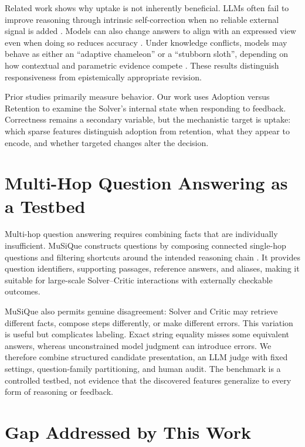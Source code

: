 Related work shows why uptake is not inherently beneficial. LLMs often fail to improve reasoning through intrinsic self-correction when no reliable external signal is added \cite{huang2024selfcorrect,kamoi2024selfcorrection}. Models can also change answers to align with an expressed view even when doing so reduces accuracy \cite{sharma2024sycophancy}. Under knowledge conflicts, models may behave as either an ``adaptive chameleon'' or a ``stubborn sloth'', depending on how contextual and parametric evidence compete \cite{xie2024chameleon}. These results distinguish responsiveness from epistemically appropriate revision.

Prior studies primarily measure behavior. Our work uses Adoption versus Retention to examine the Solver's internal state when responding to feedback. Correctness remains a secondary variable, but the mechanistic target is uptake: which sparse features distinguish adoption from retention, what they appear to encode, and whether targeted changes alter the decision.

\section{Multi-Hop Question Answering as a Testbed}

Multi-hop question answering requires combining facts that are individually insufficient. MuSiQue constructs questions by composing connected single-hop questions and filtering shortcuts around the intended reasoning chain \cite{trivedi2022musique}. It provides question identifiers, supporting passages, reference answers, and aliases, making it suitable for large-scale Solver--Critic interactions with externally checkable outcomes.

MuSiQue also permits genuine disagreement: Solver and Critic may retrieve different facts, compose steps differently, or make different errors. This variation is useful but complicates labeling. Exact string equality misses some equivalent answers, whereas unconstrained model judgment can introduce errors. We therefore combine structured candidate presentation, an LLM judge with fixed settings, question-family partitioning, and human audit. The benchmark is a controlled testbed, not evidence that the discovered features generalize to every form of reasoning or feedback.

\section{Gap Addressed by This Work}

